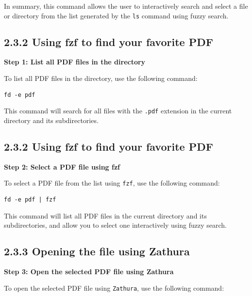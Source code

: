 \documentclass{article}
\begin{document}
In summary, this command allows the user to interactively search and select a file or directory from the list generated by the \texttt{ls} command using fuzzy search.






\subsection*{2.3.2 Using fzf to find your favorite PDF}

\textbf{Step 1: List all PDF files in the directory}

To list all PDF files in the directory, use the following command:

\begin{verbatim}
fd -e pdf
\end{verbatim}

This command will search for all files with the \texttt{.pdf} extension in the current directory and its subdirectories.







\subsection*{2.3.2 Using fzf to find your favorite PDF}

\textbf{Step 2: Select a PDF file using fzf}

To select a PDF file from the list using \texttt{fzf}, use the following command:

\begin{verbatim}
fd -e pdf | fzf
\end{verbatim}

This command will list all PDF files in the current directory and its subdirectories, and allow you to select one interactively using fuzzy search.








\subsection*{2.3.3 Opening the file using Zathura}

\textbf{Step 3: Open the selected PDF file using Zathura}

To open the selected PDF file using \texttt{Zathura}, use the following command:
\end{document}
